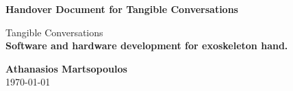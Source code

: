 \begin{titlepage}
    \begin{center}
        \vspace{2.5cm}
        \large
        \textbf{Handover Document for Tangible Conversations}
  
        \vspace{7cm}
        
            {\Large Tangible Conversations}\\
            
            \vspace{0.5cm}
            {\Large \textbf{Software and hardware development for exoskeleton hand.}}

        \vspace{5cm}
  
  

        \vfill
        \vspace{0.8cm}
        \textbf{Athanasios Martsopoulos}\\
        
        \today
  
    \end{center}
 \end{titlepage}